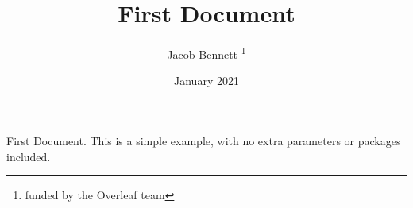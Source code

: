 \documentclass[12pt, letterpaper, twoside]{article}
\title{First Document}
\author{Jacob Bennett \thanks {funded by the Overleaf team}}
\date{January 2021}
\begin{document}
	
\begin{titlepage}
\maketitle
\end{titlepage}
	First Document. This is a simple example, with no
	extra parameters or packages included.
\end{document}
